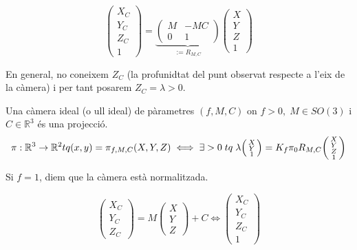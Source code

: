 \documentclass[../main.tex]{subfiles}
\begin{document}
	\begin{definicio}
		\begin{displaymath}
			\begin{pmatrix}
				X_C\\Y_C\\Z_C\\1
			\end{pmatrix}
			=
			\underbrace{\left(\begin{array}{c|c}
				M &-MC\\
				\hline
				0 & 1
		\end{array}\right)}_{:=R_{M,C}}
			\begin{pmatrix}
				X\\Y\\Z\\1
			\end{pmatrix}
		\end{displaymath}
	\end{definicio}
	En general, no coneixem $Z_C$ (la profunidtat del punt observat respecte a l'eix de la càmera) i per tant posarem $Z_C = \lambda > 0$.
	\begin{definicio}
		Una càmera ideal (o ull ideal) de pàrametres $(f, M, C)$ on $f>0,\;M \in SO(3)$ i $C \in \mathbb{R}^3$ és una projecció.
		\begin{displaymath}
			\pi: \mathbb{R}^3 \to \mathbb{R}^2\\
			tq (x,y) = \pi_{f,M,C}(X,Y,Z) \iff \exists > 0\;tq\;\lambda \begin{psmallmatrix}X\\Y\\1\end{psmallmatrix} = K_f\pi_0 R_{M,C}\begin{psmallmatrix}X\\Y\\Z\\1\end{psmallmatrix}
		\end{displaymath}
	\end{definicio}
	\begin{obs}
		Si $f = 1$, diem que la càmera està normalitzada.
	\end{obs}
	\begin{displaymath}
		\begin{pmatrix}X_C\\Y_C\\Z_C\end{pmatrix} = M\begin{pmatrix}X\\Y\\Z\end{pmatrix} + C \iff \begin{pmatrix}X_C\\Y_C\\Z_C\\1\end{pmatrix}
	\end{displaymath}
\end{document}
